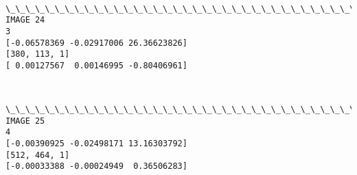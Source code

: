 \documentclass[11pt]{article}
\begin{document}
    \begin{center}
    \end{center}
    { \hspace*{\fill} \\}
    
    \begin{Verbatim}[commandchars=\\\{\}]
\_\_\_\_\_\_\_\_\_\_\_\_\_\_\_\_\_\_\_\_\_\_\_\_\_\_\_\_\_\_\_\_\_\_\_\_\_\_\_\_\_\_\_\_\_\_\_\_\_\_\_\_\_\_\_\_\_\_\_\_
IMAGE 24
3
[-0.06578369 -0.02917006 26.36623826]
[380, 113, 1]
[ 0.00127567  0.00146995 -0.80406961]

    \end{Verbatim}

    \begin{center}
    \end{center}
    { \hspace*{\fill} \\}
    
    \begin{Verbatim}[commandchars=\\\{\}]
\_\_\_\_\_\_\_\_\_\_\_\_\_\_\_\_\_\_\_\_\_\_\_\_\_\_\_\_\_\_\_\_\_\_\_\_\_\_\_\_\_\_\_\_\_\_\_\_\_\_\_\_\_\_\_\_\_\_\_\_
IMAGE 25
4
[-0.00390925 -0.02498171 13.16303792]
[512, 464, 1]
[-0.00033388 -0.00024949  0.36506283]

    \end{Verbatim}

    \begin{center}
    \end{center}
    { \hspace*{\fill} \\}
    
\end{document}
